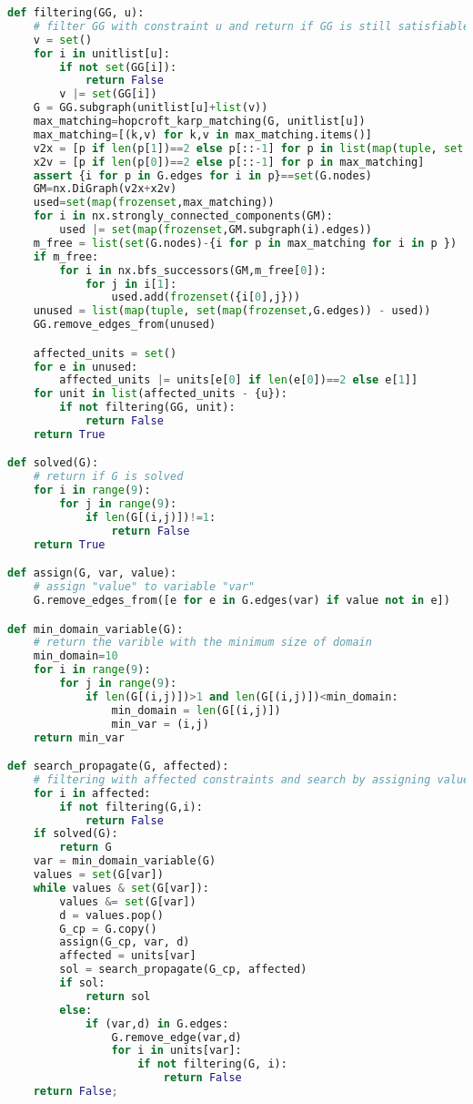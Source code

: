 \documentclass[a4paper, 12pt]{report}
\begin{document}
\begin{appendices}
\begin{lstlisting}[frame=single, language=python]
def filtering(GG, u):
    # filter GG with constraint u and return if GG is still satisfiable
    v = set()
    for i in unitlist[u]:
        if not set(GG[i]):
            return False
        v |= set(GG[i])
    G = GG.subgraph(unitlist[u]+list(v))
    max_matching=hopcroft_karp_matching(G, unitlist[u])
    max_matching=[(k,v) for k,v in max_matching.items()]
    v2x = [p if len(p[1])==2 else p[::-1] for p in list(map(tuple, set(map(frozenset,G.edges)) - set(map(frozenset,max_matching))))]
    x2v = [p if len(p[0])==2 else p[::-1] for p in max_matching]
    assert {i for p in G.edges for i in p}==set(G.nodes)
    GM=nx.DiGraph(v2x+x2v)
    used=set(map(frozenset,max_matching))
    for i in nx.strongly_connected_components(GM):
        used |= set(map(frozenset,GM.subgraph(i).edges))
    m_free = list(set(G.nodes)-{i for p in max_matching for i in p })
    if m_free:
        for i in nx.bfs_successors(GM,m_free[0]):
            for j in i[1]:
                used.add(frozenset({i[0],j}))
    unused = list(map(tuple, set(map(frozenset,G.edges)) - used))
    GG.remove_edges_from(unused)

    affected_units = set()
    for e in unused:
        affected_units |= units[e[0] if len(e[0])==2 else e[1]]
    for unit in list(affected_units - {u}):
        if not filtering(GG, unit):
            return False
    return True

def solved(G):
    # return if G is solved
    for i in range(9):
        for j in range(9):
            if len(G[(i,j)])!=1:
                return False
    return True

def assign(G, var, value):
    # assign "value" to variable "var"
    G.remove_edges_from([e for e in G.edges(var) if value not in e])

def min_domain_variable(G):
    # return the varible with the minimum size of domain
    min_domain=10
    for i in range(9):
        for j in range(9):
            if len(G[(i,j)])>1 and len(G[(i,j)])<min_domain:
                min_domain = len(G[(i,j)])
                min_var = (i,j)
    return min_var

def search_propagate(G, affected):
    # filtering with affected constraints and search by assigning value and propagate, return solution if exists, otherwise return False
    for i in affected:
        if not filtering(G,i):
            return False
    if solved(G):
        return G
    var = min_domain_variable(G)
    values = set(G[var])
    while values & set(G[var]):
        values &= set(G[var])
        d = values.pop()
        G_cp = G.copy()
        assign(G_cp, var, d)
        affected = units[var]
        sol = search_propagate(G_cp, affected)
        if sol:
            return sol
        else:
            if (var,d) in G.edges:
                G.remove_edge(var,d)
                for i in units[var]:
                    if not filtering(G, i):
                        return False
    return False;


\end{lstlisting}
\end{appendices}
\end{document}
